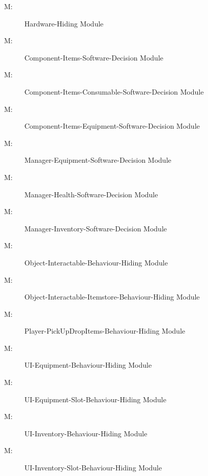 \documentclass[12pt, titlepage]{article}
\newcounter{mnum}
\newcommand{\mthemnum}{M\themnum}
\begin{document}
\begin{description}
\item [ \mthemnum \label{mHH}:] Hardware-Hiding Module
\item [ \mthemnum \label{mCISD}:] Component-Items-Software-Decision Module
\item [ \mthemnum \label{mCICSD}:] Component-Items-Consumable-Software-Decision Module
\item [ \mthemnum \label{mCIESD}:] Component-Items-Equipment-Software-Decision Module
\item [ \mthemnum \label{mMESD}:] Manager-Equipment-Software-Decision Module
\item [ \mthemnum \label{mMHSD}:] Manager-Health-Software-Decision Module
\item [ \mthemnum \label{mMISD}:] Manager-Inventory-Software-Decision Module
\item [ \mthemnum \label{mOIBH}:] Object-Interactable-Behaviour-Hiding Module
\item [ \mthemnum \label{mOIIBH}:] Object-Interactable-Itemstore-Behaviour-Hiding Module
\item [ \mthemnum \label{mPPBH}:] Player-PickUpDropItems-Behaviour-Hiding Module
\item [ \mthemnum \label{mUEBH}:] UI-Equipment-Behaviour-Hiding Module
\item [ \mthemnum \label{mUESBH}:] UI-Equipment-Slot-Behaviour-Hiding Module
\item [ \mthemnum \label{mUIBH}:] UI-Inventory-Behaviour-Hiding Module
\item [ \mthemnum \label{mUISBH}:] UI-Inventory-Slot-Behaviour-Hiding Module
\end{description}
\end{document}

